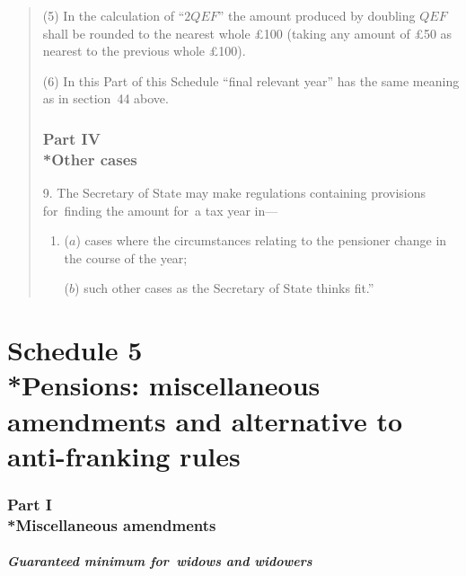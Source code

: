 \documentclass[12pt,a4paper]{article}
\begin{document}
\begin{quotation}
(5) In the calculation of “$2QEF$” the amount produced by doubling $QEF$ shall be rounded to the nearest whole £100 (taking any amount of £50 as nearest to the previous whole £100).

(6) In this Part of this Schedule “final relevant year” has the same meaning as in section~44 above.

\section*{Part IV\\*Other cases}

9. The Secretary of State may make regulations containing provisions for~finding the amount for~a tax year in—
\begin{enumerate}\item[]
($a$) cases where the circumstances relating to the pensioner change in the course of the year;

($b$) such other cases as the Secretary of State thinks fit.”
\end{enumerate}
\end{quotation}

\vfill

\part[Schedule 5 --- Pensions: miscellaneous amendments and alternative to anti-franking rules]{Schedule 5\\*Pensions: miscellaneous amendments and alternative to anti-franking rules}

\section[Part I --- Miscellaneous amendments]{Part I\\*Miscellaneous amendments}

\renewcommand\parthead{--- Schedule 5 Part I}

\subsection*{\itshape Guaranteed minimum for~widows and widowers}
\end{document}
